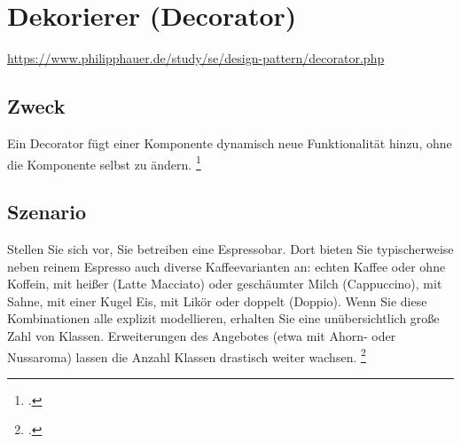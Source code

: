 \documentclass{lehramt-informatik-haupt}
\begin{document}

\chapter{Dekorierer (Decorator)}

\begin{liQuellen}
\item \cite{wiki:dekorierer}
\item \cite[Seite 149-156]{gof}
\item \url{https://www.philipphauer.de/study/se/design-pattern/decorator.php}
\item \cite[Kapitel 8.5.2, Seite 274-278]{schatten}
\item \cite[Seite 274]{schatten}
\item \cite[Kapitel 5.3, Seite 83-86]{eilebrecht}
\item \cite[Kapitel 22, Seite 269]{siebler}
\end{liQuellen}

%

\section{Zweck}

Ein Decorator fügt einer Komponente dynamisch neue Funktionalität
hinzu, ohne die Komponente selbst zu ändern.
\footcite[Seite 83]{eilebrecht}

\section{Szenario}

Stellen Sie sich vor, Sie betreiben eine Espressobar. Dort bieten Sie
typischerweise neben reinem Espresso auch diverse Kaffeevarianten an:
echten Kaffee oder ohne Koffein, mit heißer (Latte Macciato) oder
geschäumter Milch (Cappuccino), mit Sahne, mit einer Kugel Eis, mit
Likör oder doppelt (Doppio). Wenn Sie diese Kombinationen alle explizit
modellieren, erhalten Sie eine unübersichtlich große Zahl von Klassen.
Erweiterungen des Angebotes (etwa mit Ahorn- oder Nussaroma) lassen die
Anzahl Klassen drastisch weiter wachsen.
\footcite[Seite 83]{eilebrecht}
\end{document}

